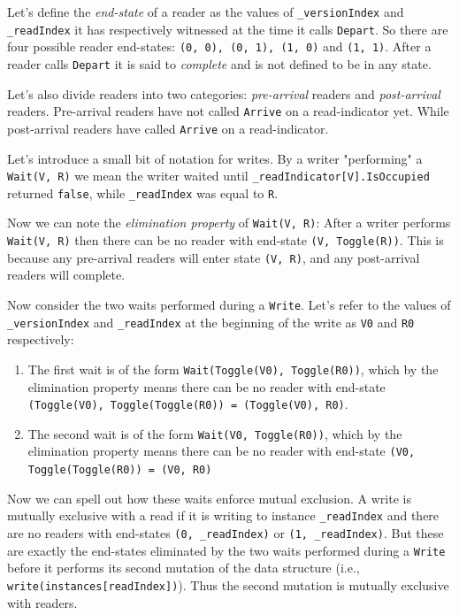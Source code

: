 \documentclass[11pt]{article}
\begin{document}
Let's define the \emph{end-state} of a reader as the values of \texttt{\_versionIndex} and \texttt{\_readIndex} it has respectively witnessed at the time it calls \texttt{Depart}. So there are four possible reader end-states: \texttt{(0, 0), (0, 1), (1, 0)} and \texttt{(1, 1)}. After a reader calls \texttt{Depart} it is said to \emph{complete} and is not defined to be in any state.

Let's also divide readers into two categories: \emph{pre-arrival} readers and \emph{post-arrival} readers. Pre-arrival readers have not called \texttt{Arrive} on a read-indicator yet. While post-arrival readers have called \texttt{Arrive} on a read-indicator.

Let's introduce a small bit of notation for writes. By a writer "performing" a \texttt{Wait(V, R)} we mean the writer waited until \texttt{\_readIndicator[V].IsOccupied} returned \texttt{false}, while \texttt{\_readIndex} was equal to \texttt{R}.

Now we can note the \emph{elimination property} of \texttt{Wait(V, R)}: After a writer performs \texttt{Wait(V, R)} then there can be no reader with end-state \texttt{(V, Toggle(R))}. This is because any pre-arrival readers will enter state \texttt{(V, R)}, and any post-arrival readers will complete.  

Now consider the two waits performed during a \texttt{Write}. Let's refer to the values of \texttt{\_versionIndex} and \texttt{\_readIndex} at the beginning of the write as \texttt{V0} and \texttt{R0} respectively:

\begin{enumerate}
\item The first wait is of the form \texttt{Wait(Toggle(V0), Toggle(R0))}, which by the elimination property means there can be no reader with end-state \texttt{(Toggle(V0), Toggle(Toggle(R0)) = (Toggle(V0), R0)}.
\item The second wait is of the form \texttt{Wait(V0, Toggle(R0))}, which by the elimination property means there can be no reader with end-state \texttt{(V0, Toggle(Toggle(R0)) = (V0, R0)}
\end{enumerate}

Now we can spell out how these waits enforce mutual exclusion. A write is mutually exclusive with a read if it is writing to instance \texttt{\_readIndex} and there are no readers with end-states \texttt{(0, \_readIndex)} or \texttt{(1, \_readIndex)}. But these are exactly the end-states eliminated by the two waits performed during a \texttt{Write} before it performs its second mutation of the data structure (i.e., \texttt{write(instances[readIndex])}). Thus the second mutation is mutually exclusive with readers.
\end{document}
